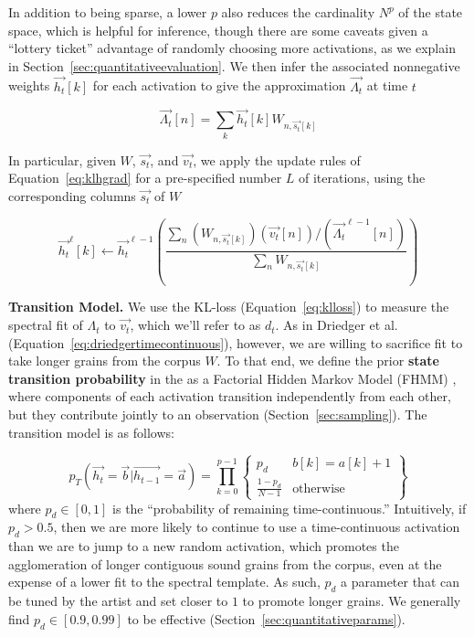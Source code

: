 \documentclass{article}
\begin{document}
    In addition to being sparse, a lower $p$ also reduces the cardinality $N^p$ of the state space, which is helpful for inference, though there are some caveats given a ``lottery ticket'' advantage of randomly choosing more activations, as we explain in Section~\ref{sec:quantitativeevaluation}.  We then infer the associated nonnegative weights $\vec{h_t}[k]$ for each activation to give the approximation $\vec{\Lambda_t}$ at time $t$
    
    \begin{equation}
        \label{eq:approximation}
        \vec{\Lambda_t}[n] = \sum_{k} \vec{h_t}[k]  W_{n, \vec{s_t}[k]}
    \end{equation}

    In particular, given $W$, $\vec{s_t}$, and $\vec{v_t}$, we apply the update rules of Equation~\ref{eq:klhgrad} for a pre-specified number $L$ of iterations, using the corresponding columns $\vec{s_t}$ of $W$

    \begin{equation}
        \label{eq:sparseklhgrad}
        \vec{h_t}^{\ell}[k]  \gets \vec{h_t}^{\ell-1} \left(  \frac{\sum_n (W_{n, \vec{s_t}[k]}) (\vec{v_t}[n]) / (\vec{\Lambda_t}^{\ell-1}[n]) }{ \sum_{n} W_{n, \vec{s_t}[k]}} \right)
    \end{equation}
    

    \textbf{Transition Model.} We use the KL-loss (Equation~\ref{eq:klloss}) to measure the spectral fit of $\Lambda_t$ to $\vec{v_t}$, which we'll refer to as $d_t$.  As in Driedger et al. \cite{driedger2015let} (Equation~\ref{eq:driedgertimecontinuous}), however, we are willing to sacrifice fit to take longer grains from the corpus $W$.  To that end, we define the prior  \textbf{state transition probability} in the as a Factorial Hidden Markov Model (FHMM) \cite{ghahramani1995factorial}, where components of each activation transition independently from each other, but they contribute jointly to an observation (Section~\ref{sec:sampling}).  The transition model is as follows:

    \begin{equation}
        \label{eq:transitionprob}
        p_T(\vec{h_t} = \vec{b} | \vec{h_{t-1}} = \vec{a}) = \prod_{k=0}^{p-1} \left\{  \begin{array}{cc}  p_d & b[k] = a[k]+1  \\ \frac{1-p_d}{N-1} & \text{otherwise} \end{array} \right\}
    \end{equation}
    where $p_d \in [0, 1]$ is the ``probability of remaining time-continuous.''  Intuitively, if $p_d > 0.5$, then we are more likely to continue to use a time-continuous activation than we are to jump to a new random activation, which promotes the agglomeration of longer contiguous sound grains from the corpus, even at the expense of a lower fit to the spectral template.  As such, $p_d$ a parameter that can be tuned by the artist and set closer to $1$ to promote longer grains.  We generally find $p_d \in [0.9, 0.99]$ to be effective (Section~\ref{sec:quantitativeparams}).
\end{document}
